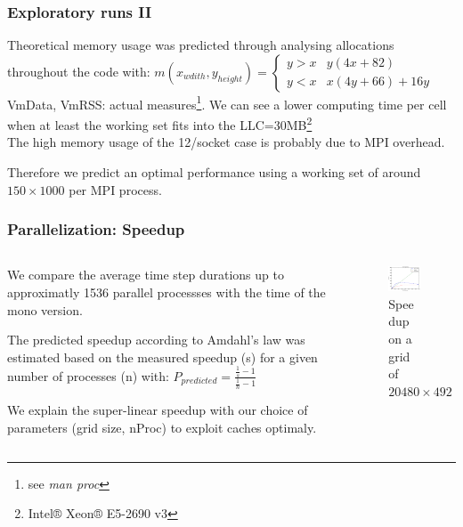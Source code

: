 \documentclass{beamer}
\begin{document}
%
%
%
\begin{frame}
\frametitle{Exploratory runs II}

Theoretical memory usage was predicted through analysing allocations throughout the code with: $m(x_{wdith},y_{height})=\begin{cases}
y>x & y(4x+82)\\
y<x & x(4y+66)+16y\end{cases}$ \\
VmData, VmRSS: actual measures\footnote{see \emph{man proc}}. We can see a lower computing time per cell when at least the working set fits into the LLC=30MB\footnote{Intel® Xeon® E5-2690 v3}\\ The high memory usage of the 12/socket case is probably due to MPI overhead.
 
Therefore we predict an optimal performance using a working set of around $150\times1000$ per MPI process.

\end{frame}
%
%
%
\begin{frame}
\frametitle{Parallelization: Speedup}
\begin{minipage}[1\textheight]{\textwidth}
\begin{columns}[T]
\begin{column}{0.5\textwidth}
\vspace{5mm}
\justify

We compare the average time step durations up to approximatly 1536 parallel processses with the time of the mono version.

The predicted speedup according to Amdahl's law was estimated based on the measured speedup (s) for a given number of processes (n) with: $P_{predicted}=\frac{\frac{1}{s}-1}{\frac{1}{n}-1}$


We explain the super-linear speedup with our choice of parameters (grid size, nProc) to exploit caches optimaly.



\end{column}
\begin{column}{0.5\textwidth}
\begin{figure}
\includegraphics[width=6cm]{speedup.pdf}
\caption{Speedup on a grid of $20480\times 492$}

\end{figure}
\end{column}
\end{columns}
\end{minipage}
\end{frame}
\end{document}
